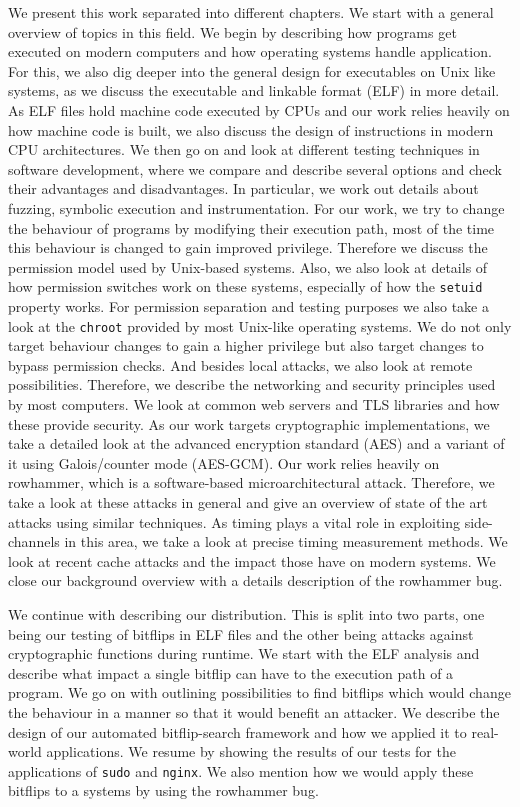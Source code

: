 We present this work separated into different chapters. We start with a general
overview of topics in this field. We begin by describing how programs get
executed on modern computers and how operating systems handle application. For
this, we also dig deeper into the general design for executables on Unix like
systems, as we discuss the executable and linkable format (ELF) in more detail.
As ELF files hold machine code executed by CPUs and our work relies heavily on
how machine code is built, we also discuss the design of instructions in modern
CPU architectures.  We then go on and look at different testing techniques in
software development, where we compare and describe several options and check
their advantages and disadvantages. In particular, we work out details about
fuzzing, symbolic execution and instrumentation. For our work, we try to change
the behaviour of programs by modifying their execution path, most of the time
this behaviour is changed to gain improved privilege. Therefore we discuss the
permission model used by Unix-based systems. Also, we also look at details of
how permission switches work on these systems, especially of how the
\texttt{setuid} property works. For permission separation and testing purposes
we also take a look at the \texttt{chroot} provided by most Unix-like operating
systems. We do not only target behaviour changes to gain a higher privilege but
also target changes to bypass permission checks. And besides local attacks, we
also look at remote possibilities. Therefore, we describe the networking and
security principles used by most computers. We look at common web servers and
TLS libraries and how these provide security. As our work targets cryptographic
implementations, we take a detailed look at the advanced encryption standard
(AES) and a variant of it using Galois/counter mode (AES-GCM). Our work relies
heavily on rowhammer, which is a software-based microarchitectural attack.
Therefore, we take a look at these attacks in general and give an overview of
state of the art attacks using similar techniques. As timing plays a vital role
in exploiting side-channels in this area, we take a look at precise timing
measurement methods. We look at recent cache attacks and the impact those have
on modern systems. We close our background overview with a details description
of the rowhammer bug.

We continue with describing our distribution. This is split into two parts, one
being our testing of bitflips in ELF files and the other being attacks against
cryptographic functions during runtime. We start with the ELF analysis and
describe what impact a single bitflip can have to the execution path of a
program. We go on with outlining possibilities to find bitflips which would
change the behaviour in a manner so that it would benefit an attacker. We
describe the design of our automated bitflip-search framework and how we applied
it to real-world applications. We resume by showing the results of our tests for
the applications of \texttt{sudo} and \texttt{nginx}. We also mention how we
would apply these bitflips to a systems by using the rowhammer bug.

